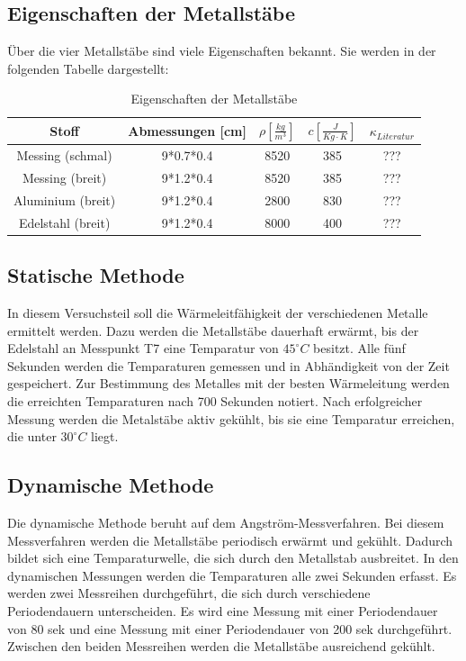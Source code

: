 \documentclass[11pt]{article}
\begin{document}
\subsection{Eigenschaften der Metallstäbe}
Über die vier Metallstäbe sind viele Eigenschaften bekannt. Sie werden in der folgenden Tabelle dargestellt:
\begin{table}[h]
\centering
\begin{tabular}{|c|c|c|c|c|}
\hline
Stoff & Abmessungen [cm] & $\rho \left[ \frac{kg}{m^3} \right] $ & $c \left[ \frac{J}{Kg \cdot K} \right]$ & $ \kappa_{Literatur}$ \\
\hline
Messing (schmal) & 9*0.7*0.4 & 8520 & 385 & ???\\
Messing (breit) & 9*1.2*0.4 & 8520 & 385 & ???\\
Aluminium (breit) & 9*1.2*0.4 & 2800 & 830 & ???\\
Edelstahl (breit) & 9*1.2*0.4 & 8000 & 400 & ???\\
\hline
\end{tabular}
\caption{Eigenschaften der Metallstäbe}
\end{table}
\subsection{Statische Methode}
In diesem Versuchsteil soll die Wärmeleitfähigkeit der verschiedenen Metalle ermittelt werden. Dazu werden die Metallstäbe dauerhaft erwärmt, bis der Edelstahl an Messpunkt T7 eine Temparatur von $45^\circ C$ besitzt. Alle fünf Sekunden werden die Temparaturen gemessen und in Abhändigkeit von der Zeit gespeichert. Zur Bestimmung des Metalles mit der besten Wärmeleitung werden die erreichten Temparaturen nach 700 Sekunden notiert. Nach erfolgreicher Messung werden die Metalstäbe aktiv gekühlt, bis sie eine Temparatur erreichen, die unter $30^\circ C$ liegt.
\subsection{Dynamische Methode}
Die dynamische Methode beruht auf dem Angström-Messverfahren. Bei diesem Messverfahren werden die Metallstäbe periodisch erwärmt und gekühlt. Dadurch bildet sich eine Temparaturwelle, die sich durch den Metallstab ausbreitet.
In den dynamischen Messungen werden die Temparaturen alle zwei Sekunden erfasst.
Es werden zwei Messreihen durchgeführt, die sich durch verschiedene Periodendauern unterscheiden. Es wird eine Messung mit einer Periodendauer von 80 sek und eine Messung mit einer Periodendauer von 200 sek durchgeführt. Zwischen den beiden Messreihen werden die Metallstäbe ausreichend gekühlt.
\end{document}
